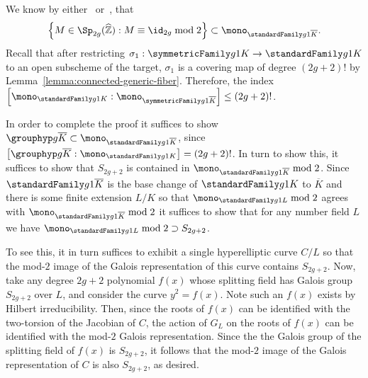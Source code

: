 We know by either~\cite[Lemma 8.12]{mumford:tata-lectures-on-theta-ii} or~\cite[Th\'eor\`eme 1]{acampo:tresses-monodromie-et-le-groupe-symplectique},
	that 
	\begin{align*}
		\left\{
	M \in \Sp_{2g}(\widehat{\mathbb Z}) :M \equiv \id_{2g} \bmod 2
\right\} \subset \mono_{\standardFamily g 1 {\overline K}}.
	\end{align*}
	Recall that after restricting $\sigma_1: \symmetricFamily g 1 K \rightarrow \standardFamily g 1 K$ 
	to an open subscheme of the target,
	$\sigma_1$ is a covering map of degree $(2g+2)!$ by
	Lemma~\ref{lemma:connected-generic-fiber}.
	Therefore, the index $\left[ \mono_{\standardFamily g 1 K} : \mono_{\symmetricFamily g 1 {\overline K}} \right] \leq (2g+2)!$.

	In order to complete the proof it suffices to show
	$\grouphyp g {\overline K} \subset \mono_{\standardFamily g 1 {\overline K}}$, since $\left[  \grouphyp g {\overline K} : \mono_{\standardFamily g 1 K} \right] = (2g+2)!$.
In turn to show this, it suffices to show that
$S_{2g+2}$ is contained in $\mono_{\standardFamily g 1 {\overline K}} \bmod 2$.
Since $\standardFamily g 1 {\overline K}$ is the base change of
$\standardFamily g 1 K$ to ${\overline K}$
and there is some finite extension $L/K$ so that
$\mono_{\standardFamily g 1 L} \bmod 2$
agrees with $\mono_{\standardFamily g 1 {\overline K}} \bmod 2$ 
it suffices to show that for any number field $L$ we have
$\mono_{\standardFamily g 1 L} \bmod 2 \supset S_{2g+2}$.
	
To see this, it in turn suffices to exhibit a single hyperelliptic
curve $C/L$ so that the mod-$2$ image of the Galois representation of this curve
contains $S_{2g+2}$.
Now, take any degree $2g+2$ polynomial $f(x)$ whose splitting field has
Galois group
$S_{2g+2}$ over $L$,
and consider the curve $y^2 = f(x)$.
Note such an $f(x)$ exists by Hilbert irreducibility.
Then, since the roots of $f(x)$ can be identified with the two-torsion
of the Jacobian of $C$, the action of $G_L$ on the roots of $f(x)$
can be identified with the mod-$2$ Galois representation.
Since the the Galois group of the splitting field of $f(x)$ is $S_{2g+2}$,
it follows that the mod-$2$ image of the Galois representation of $C$
is also $S_{2g+2}$, as desired.




